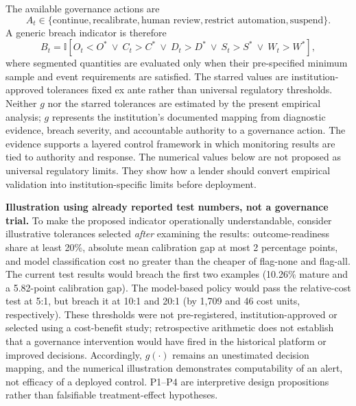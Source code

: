\documentclass[10pt]{article}
\begin{document}
The available governance actions are
\[
A_t\in\{\text{continue},\text{recalibrate},\text{human review},
\text{restrict automation},\text{suspend}\}.
\]
A generic breach indicator is therefore
\[
B_t=\mathbb{I}
\left[
O_t<O^{*}
\ \lor\ 
C_t>C^{*}
\ \lor\
D_t>D^{*}
\ \lor\
S_t>S^{*}
\ \lor\
W_t>W^{*}
\right],
\]
where segmented quantities are evaluated only when their pre-specified minimum sample and event requirements are satisfied. The starred values are institution-approved tolerances fixed ex ante rather than universal regulatory thresholds. Neither $g$ nor the starred tolerances are estimated by the present empirical analysis; $g$ represents the institution's documented mapping from diagnostic evidence, breach severity, and accountable authority to a governance action. The evidence supports a layered control framework in which monitoring results are tied to authority and response. The numerical values below are not proposed as universal regulatory limits. They show how a lender should convert empirical validation into institution-specific limits before deployment.

\noindent\textbf{Illustration using already reported test numbers, not a governance trial.} To make the proposed indicator operationally understandable, consider illustrative tolerances selected \emph{after} examining the results: outcome-readiness share at least 20\%, absolute mean calibration gap at most 2 percentage points, and model classification cost no greater than the cheaper of flag-none and flag-all. The current test results would breach the first two examples (10.26\% mature and a 5.82-point calibration gap). The model-based policy would pass the relative-cost test at 5:1, but breach it at 10:1 and 20:1 (by 1,709 and 46 cost units, respectively). These thresholds were not pre-registered, institution-approved or selected using a cost-benefit study; retrospective arithmetic does not establish that a governance intervention would have fired in the historical platform or improved decisions. Accordingly, $g(\cdot)$ remains an unestimated decision mapping, and the numerical illustration demonstrates computability of an alert, not efficacy of a deployed control. P1--P4 are interpretive design propositions rather than falsifiable treatment-effect hypotheses.
\end{document}
